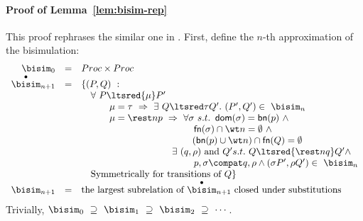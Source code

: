 \documentclass{LMCS}
\begin{document}
\paragraph{Proof of Lemma~\ref{lem:bisim-rep}}
This proof rephrases the similar one in \cite{sangiorgi.walker:theory-mobile}. 
First, define the $n$-th approximation of the bisimulation:
$$
\begin{array}{rcl}
\bisim_0 & = & Proc \times Proc
\\
\stackrel\bullet\bisim_{n+1} & = & \{(P,Q)\ : 
\\
&& \quad \forall\ P\ltsred{\mu}P'\\
&& \quad\qquad \mu=\tau\ \Rightarrow\ \exists\ Q\ltsred\tau Q'.\ (P',Q')\in\ \bisim_n\\
&& \quad\qquad \mu=\rest n p \ \Rightarrow\ \forall \sigma\ s.t.\ \,{\sf dom}(\sigma)={\sf bn}(p)\ \wedge \\
&& \qquad\qquad\qquad\qquad\qquad\qquad {\sf fn}(\sigma)\cap\wt n=\emptyset\ \wedge \\
&& \qquad\qquad\qquad\qquad\qquad\qquad\! ({\sf bn}(p)\cup\wt n)\cap{\sf fn}(Q) =\emptyset\\ 
&& \quad\qquad\qquad\qquad\qquad\ \ \exists\ (q,\rho)\mbox{ and } Q' s.t.\ Q\ltsred{\rest n q}Q' \wedge \\
&& \qquad\qquad\qquad\qquad\qquad\qquad p,\sigma\compat q,\rho
	\wedge (\sigma P',\rho Q')\in\ \bisim_n\\
&& \quad \mbox{Symmetrically for transitions of } Q \}
\\
\bisim_{n+1} & = & \mbox{the largest subrelation of $\stackrel\bullet\bisim_{n+1}$ closed under substitutions}
\end{array}
$$
Trivially, $\bisim_0\ \supseteq\ \bisim_1\ \supseteq\ \bisim_2\ \supseteq\ \cdots\,$.
\end{document}
